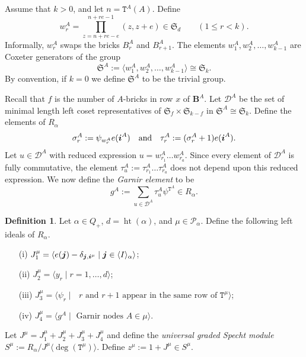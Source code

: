 \documentclass[twoside,11pt,reqno,letter]{amsart}
\numberwithin{equation}{section}
\theoremstyle{definition}  %
\newtheorem{Definition}[equation]{Definition}
\let\<\langle
\let\>\rangle
\def\bi{\text{\boldmath$i$}}
\def\bj{\text{\boldmath$j$}}
\newcommand{\words}{\langle I \rangle}
\newcommand{\0}{{\bar 0}}
\newcommand{\1}{{\bar 1}}
\newcommand{\al}{\alpha}
\def\Si{\mathfrak{S}}
\newcommand{\si}{\sigma}
\newcommand{\de}{\delta}
\def\Belt{\mathbf{B}}
\newcommand{\D}{{\mathscr D}}
\newcommand\Par{\mathscr P}
\def\T{{\mathtt T}}
\def\height{{\operatorname{ht}}}
\begin{document}
Assume that $k > 0$, and let $n = \T^A(A)$. Define
$$
w^A_r = \prod_{z=n+re-e}^{n+re-1} (z, z+e) \in \Si_d \qquad (1\leq r < k).
$$
Informally, $w^A_r$ swaps the bricks $B^A_r$ and $B^A_{r+1}$. The elements $w^A_1, w^A_2, \dots, w^A_{k-1}$ are Coxeter generators of the group
$$\Si^A := \< w^A_1, w^A_2, \dots, w^A_{k-1} \> \cong \Si_k.$$
By convention, if $k=0$ we define $\Si^A$ to be the trivial group.

Recall that $f$ is the number of $A$-bricks in row $x$ of $\Belt^A$. Let $\D^A$ be the set of minimal length left coset representatives of $\Si_f \times \Si_{k-f}$ in $\Si^A \cong \Si_k$. Define the elements of $R_\al$
$$\si^A_r := \psi_{w^A_r} e(\bi^A) \quad\text{and}\quad \tau^A_r := (\si^A_r + 1)e(\bi^A).$$
Let $u \in \D^A$ with reduced expression $u = w^A_{r_1} \dots w^A_{r_a}$. Since every element of $\D^A$ is fully commutative, the element
$\tau^A_u := \tau^A_{r_1} \dots \tau^A_{r_a}$
does not depend upon this reduced expression. We now define the \emph{Garnir element} to be
$$g^A := \sum_{u \in \D^A} \tau^A_u \psi^{\T^A} \in R_\al.$$

\begin{Definition} \label{DSpecht}%
Let $\al\in Q_+$, $d=\height(\al)$, and $\mu\in\Par_\al$. Define the following left ideals of $R_\al$.
\begin{enumerate}
\item[{\rm (i)}] $J_1^\mu = \<e(\bj) - \de_{\bj,\bi^\mu} \mid \bj\in \words_\al\>$;
\item[{\rm (ii)}] $J_2^\mu = \<y_r \mid r=1,\dots,d\>$;
\item[{\rm (iii)}] $J_3^\mu = \<\psi_r \mid \text{ $r$ and $r+1$ appear in the same row of } \T^\mu\>$;
\item[{\rm (iv)}] $J_4^\mu = \< g^A \mid \text{ Garnir nodes } A \in \mu\>$. 
\end{enumerate}
Let $J^\mu = J_1^\mu + J_2^\mu + J_3^\mu + J_4^\mu$ and define the {\em universal graded Specht module}\, $S^\mu:=R_\al / J^\mu \<\deg(\T^\mu)\>$. Define $z^\mu := 1 + J^\mu \in S^\mu$.%
\end{Definition}
\end{document}
